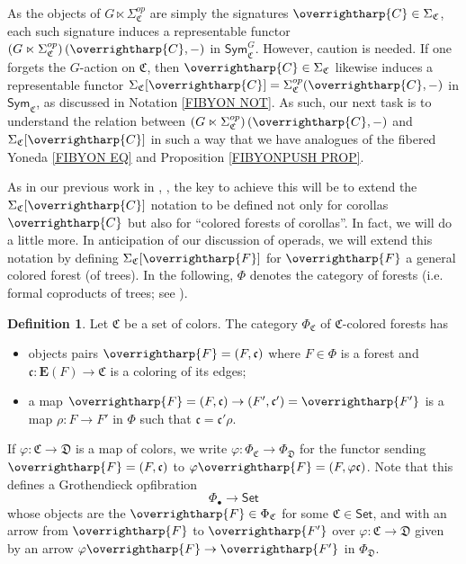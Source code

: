 \documentclass[a4paper,10pt
,draft
]{article}%
\numberwithin{equation}{section}
\numberwithin{figure}{section}
\theoremstyle{definition} %
\newtheorem{definition}[equation]{Definition}%
\newcommand{\vect}[1]{\text{\overrightharp{\ensuremath{#1}}}}
\newcommand{\1}{\ensuremath{\mathbbm 1}}%
\begin{document}
As the objects of 
$G \ltimes \Sigma^{op}_{\mathfrak{C}}$
are simply the signatures
$\vect{C} \in \Sigma_{\mathfrak{C}}$,
each such signature induces a representable functor
$\left(G \ltimes \Sigma^{op}_{\mathfrak{C}}\right)(\vect{C},-)$
in 
$\mathsf{Sym}^G_{\mathfrak{C}}$.
However, caution is needed.
If one forgets the $G$-action on $\mathfrak{C}$,
then $\vect{C} \in \Sigma_{\mathfrak{C}}$
likewise induces a representable functor 
$\Sigma_{\mathfrak{C}}[\vect{C}]=\Sigma^{op}_{\mathfrak{C}}(\vect{C},-)$
in $\mathsf{Sym}_{\mathfrak{C}}$,
as discussed in Notation \ref{FIBYON NOT}.
%
As such, our next task is to understand the relation between 
$\left(G \ltimes \Sigma^{op}_{\mathfrak{C}}\right)(\vect{C},-)$
and 
$\Sigma_{\mathfrak{C}}[\vect{C}]$
in such a way that we have analogues of the 
fibered Yoneda \eqref{FIBYON EQ}
and Proposition \ref{FIBYONPUSH PROP}.


As in our previous work in 
\cite[Not. 5.56]{Per18}, \cite[\S 2.3]{BP_edss},
the key to achieve this will be to extend the
$\Sigma_{\mathfrak{C}}[\vect{C}]$
notation to be defined not only for corollas $\vect{C}$
but also for ``colored forests of corollas''.
In fact, we will do a little more. 
In anticipation of our discussion of operads, 
we will extend this notation by defining 
$\Sigma_{\mathfrak{C}}[\vect{F}]$
for $\vect{F}$ a general colored forest (of trees).
In the following, $\Phi$ denotes the category of forests
(i.e. formal coproducts of trees; see \cite[\S 5.1]{Per18}).

\begin{definition}\label{COLFOR DEF}
Let $\mathfrak{C}$ be a set of colors.
The category $\Phi_{\mathfrak{C}}$ of $\mathfrak{C}$-colored forests has
\begin{itemize}
\item objects pairs
$\vect{F} = (F,\mathfrak{c})$
where 
$F\in \Phi$ is a forest
and 
$\mathfrak{c}\colon \boldsymbol{E}(F) \to \mathfrak{C}$ 
is a coloring of its edges;
\item a map
$\vect{F}=(F,\mathfrak{c}) \to 
(F',\mathfrak{c}') = \vect{F'}$
is a map $\rho \colon F \to F'$ in $\Phi$
such that
$\mathfrak{c} = \mathfrak{c}' \rho$.
\end{itemize}
If $\varphi\colon \mathfrak{C} \to \mathfrak{D}$ is a map of colors,
we write
$\varphi \colon \Phi_{\mathfrak{C}} \to \Phi_{\mathfrak{D}}$
for the functor sending 
$\vect{F} = (F,\mathfrak{c})$
to 
$\varphi\vect{F} = (F,\varphi\mathfrak{c})$.
Note that this defines a Grothendieck opfibration
\begin{equation}\label{PHIBGRO EQ}
\Phi_{\bullet} \to \mathsf{Set}
\end{equation}
whose objects are the $\vect{F} \in \Phi_{\mathfrak{C}}$ for some
$\mathfrak{C} \in \mathsf{Set}$,
and with an arrow
from $\vect{F}$ to $\vect{F'}$
over
$\varphi \colon \mathfrak{C} \to \mathfrak{D}$
given by an arrow
$\varphi \vect{F} \to \vect{F'}$ in $\Phi_{\mathfrak{D}}$.
\end{definition}
\end{document}
